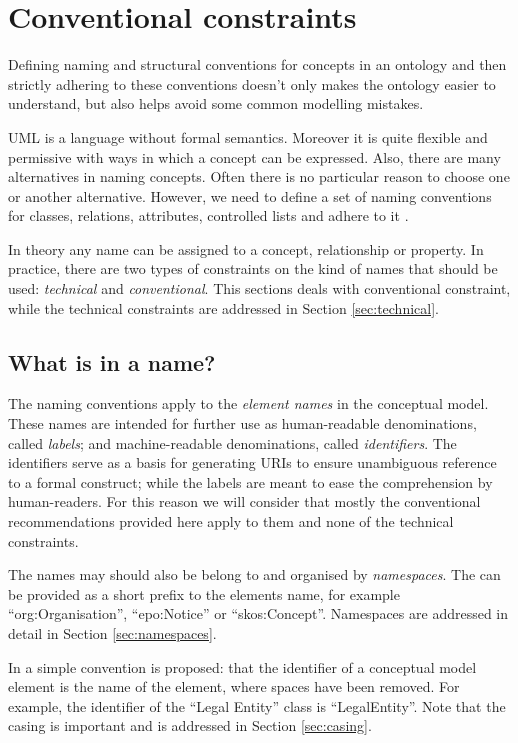 \section{Conventional constraints}
\label{sec:conventional}

	Defining naming and structural conventions for concepts in an ontology and then strictly adhering to these conventions doesn't only makes the ontology easier to understand, but also helps avoid some common modelling mistakes. 
	
	UML is a language without formal semantics. Moreover it is quite flexible and permissive with ways in which a concept can be expressed. Also, there are many alternatives in naming concepts. Often there is no particular reason to choose one or another alternative. However, we need to define a set of naming conventions for classes, relations, attributes, controlled lists and adhere to it \cite{noy2001}.

	In theory any name can be assigned to a concept, relationship or property. In practice, there are two types of constraints on the kind of names that should be used: \textit{technical} and \textit{conventional}. This sections deals with conventional constraint, while the technical constraints are addressed in Section \ref{sec:technical}.
	
	\subsection{What is in a name?}
	\label{sec:name}
		
	The naming conventions apply to the \textit{element names} in the conceptual model. These names are intended for further use as human-readable denominations, called \textit{labels}; and machine-readable denominations, called \textit{identifiers}. The identifiers serve as a basis for generating URIs \cite{rfc3986} to ensure unambiguous reference to a formal construct; while the labels are meant to ease the comprehension by human-readers. For this reason we will consider that mostly the conventional recommendations provided here apply to them and none of the technical constraints.

	The names may should also be belong to and organised by \textit{namespaces}. The can be provided as a short prefix to the elements name, for example ``org:Organisation'', ``epo:Notice'' or ``skos:Concept''. Namespaces are addressed in detail in Section \ref{sec:namespaces}.
	
	In \cite{isaHandbook2015} a simple convention is proposed: that the identifier of a conceptual model element is the name of the element, where spaces have been removed. For example, the identifier of the ``Legal Entity'' class is ``LegalEntity''. Note that the casing is important and is addressed in Section \ref{sec:casing}.
	
